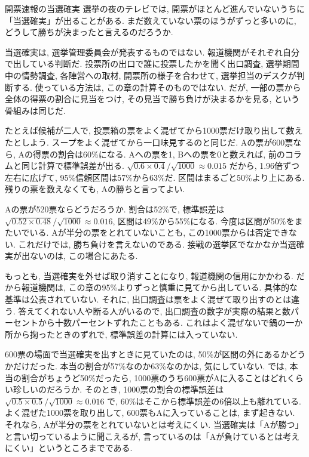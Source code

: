   \begin{mybox}{開票速報の当選確実}
    選挙の夜のテレビでは, 開票がほとんど進んでいないうちに「当選確実」が出ることがある.
    まだ数えていない票のほうがずっと多いのに, どうして勝ちが決まったと言えるのだろうか.

    当選確実は, 選挙管理委員会が発表するものではない.
    報道機関がそれぞれ自分で出している判断だ.
    投票所の出口で誰に投票したかを聞く出口調査, 選挙期間中の情勢調査, 各陣営への取材, 開票所の様子を合わせて, 選挙担当のデスクが判断する.
    使っている方法は, この章の計算そのものではない.
    だが, 一部の票から全体の得票の割合に見当をつけ, その見当で勝ち負けが決まるかを見る, という骨組みは同じだ.

    たとえば候補が二人で, 投票箱の票をよく混ぜてから1000票だけ取り出して数えたとしよう.
    スープをよく混ぜてから一口味見するのと同じだ.
    Aの票が600票なら, Aの得票の割合は60\%になる.
    Aへの票を1, Bへの票を0と数えれば, 前のコラムと同じ計算で標準誤差が出る.
    $\sqrt{0.6 \times 0.4}/\sqrt{1000} \approx 0.015$ だから, 1.96倍ずつ左右に広げて, 95\%信頼区間は57\%から63\%だ.
    区間はまるごと50\%より上にある.
    残りの票を数えなくても, Aの勝ちと言ってよい.

    Aの票が520票ならどうだろうか.
    割合は52\%で, 標準誤差は $\sqrt{0.52 \times 0.48}/\sqrt{1000} \approx 0.016$, 区間は49\%から55\%になる.
    今度は区間が50\%をまたいでいる.
    Aが半分の票をとれていないことも, この1000票からは否定できない.
    これだけでは, 勝ち負けを言えないのである.
    接戦の選挙区でなかなか当選確実が出ないのは, この場合にあたる.

    もっとも, 当選確実を外せば取り消すことになり, 報道機関の信用にかかわる.
    だから報道機関は, この章の95\%よりずっと慎重に見てから出している.
    具体的な基準は公表されていない.
    それに, 出口調査は票をよく混ぜて取り出すのとは違う.
    答えてくれない人や断る人がいるので, 出口調査の数字が実際の結果と数パーセントから十数パーセントずれたこともある.
    これはよく混ぜないで鍋の一か所から掬ったときのずれで, 標準誤差の計算には入っていない.

    600票の場面で当選確実を出すときに見ていたのは, 50\%が区間の外にあるかどうかだけだった.
    本当の割合が57\%なのか63\%なのかは, 気にしていない.
    では, 本当の割合がちょうど50\%だったら, 1000票のうち600票がAに入ることはどれくらい珍しいのだろうか.
    そのとき, 1000票の割合の標準誤差は $\sqrt{0.5 \times 0.5}/\sqrt{1000} \approx 0.016$ で, 60\%はそこから標準誤差の6倍以上も離れている.
    よく混ぜた1000票を取り出して, 600票もAに入っていることは, まず起きない.
    それなら, Aが半分の票をとれていないとは考えにくい.
    当選確実は「Aが勝つ」と言い切っているように聞こえるが, 言っているのは「Aが負けているとは考えにくい」というところまでである.
  \end{mybox}

